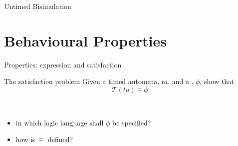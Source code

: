 \documentclass[aspectratio=169]{beamer}
\def\R{\mathcal{R}}
\def\TL#1{\mathcal{T}(#1)}
\begin{document}
\begin{slide}{Untimed Bisimulation}
\small

\exerciseBack



\end{slide}
\exerciseAdd

\section{Behavioural Properties}
\begin{slide}{Properties: expression and satisfaction}
\small
\begin{block}{The satisfaction problem }
Given a \alert{timed automata}, $ta$, and a , $\phi$, show that
\begin{equation*}
\TL{ta} \models \phi
\end{equation*}
\end{block}
~\\

\pause
\begin{itemize}
\item in which logic language shall $\phi$ be specified?
\item how is $\models$ defined?
\end{itemize}
\end{slide}
\end{document}
